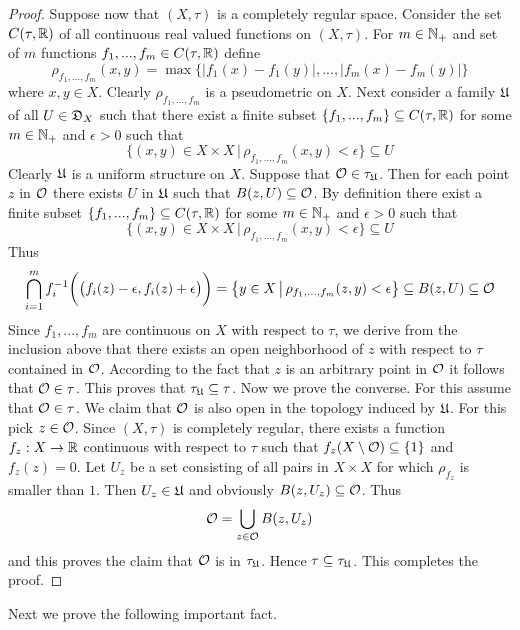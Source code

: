 \begin{proof}
Suppose now that $(X,\tau)$ is a completely regular space. Consider the set $C(\tau,{\mathbb R})$ of all continuous real valued functions on $(X,\tau)$. For $m\in {\mathbb N}_+$ and set of $m$ functions $f_1,...,f_m\in C(\tau,{\mathbb R})$ define
$$\rho_{f_1,...,f_m}(x,y) = \max \big\{|f_1(x) - f_1(y)|,...,|f_m(x) - f_m(y)|\big\}$$
where $x,y\in X$. Clearly $\rho_{f_1,...,f_m}$ is a pseudometric on $X$. Next consider a family ${\mathfrak U}$ of all $U\in {\mathfrak D}_X$ such that there exist a finite subset $\{f_1,...,f_m\}\subseteq C(\tau,{\mathbb R})$ for some $m \in {\mathbb N}_+$ and $\epsilon > 0$ such that
$$\big\{(x,y)\in X\times X\,\big|\,\rho_{f_1,...,f_m}(x,y) < \epsilon\big\}\subseteq U$$
Clearly ${\mathfrak U}$ is a uniform structure on $X$. Suppose that ${\mathcal O} \in \tau_{{\mathfrak U}}$. Then for each point $z$ in ${\mathcal O}$ there exists $U$ in ${\mathfrak U}$ such that $B(z,U)\subseteq {\mathcal O}$. By definition there exist a finite subset $\{f_1,...,f_m\}\subseteq C(\tau,{\mathbb R})$ for some $m \in {\mathbb N}_+$ and $\epsilon > 0$ such that
$$\big\{(x,y)\in X\times X\,\big|\,\rho_{f_1,...,f_m}(x,y) < \epsilon\big\}\subseteq U$$
Thus
$$\bigcap_{i=1}^mf_i^{-1}\bigg(\big(f_i(z) - \epsilon, f_i(z) + \epsilon\big)\bigg) = \big\{y\in X \,\big|\, \rho_{f_1,...,f_m}(z,y) < \epsilon\big\} \subseteq B(z,U)\subseteq {\mathcal O}$$
Since $f_1,...,f_m$ are continuous on $X$ with respect to $\tau$, we derive from the inclusion above that there exists an open neighborhood of $z$ with respect to $\tau$ contained in ${\mathcal O}$. According to the fact that $z$ is an arbitrary point in ${\mathcal O}$ it follows that ${\mathcal O} \in \tau$. This proves that $\tau_{{\mathfrak U}}\subseteq \tau$. Now we prove the converse. For this assume that ${\mathcal O} \in \tau$. We claim that ${\mathcal O}$ is also open in the topology induced by ${\mathfrak U}$. For this pick $z \in {\mathcal O}$. Since $(X,\tau)$ is completely regular, there exists a function $f_z:X\rightarrow {\mathbb R}$ continuous with respect to $\tau$ such that $f_z(X\setminus {\mathcal O})\subseteq \{1\}$ and $f_z(z) = 0$. Let $U_z$ be a set consisting of all pairs in $X\times X$ for which $\rho_{f_z}$ is smaller than $1$. Then $U_z\in {\mathfrak U}$ and obviously $B(z,U_z)\subseteq {\mathcal O}$. Thus
$${\mathcal O} = \bigcup_{z\in {\mathcal O}}B(z,U_z)$$
and this proves the claim that ${\mathcal O}$ is in $\tau_{{\mathfrak U}}$. Hence $\tau \subseteq \tau_{{\mathfrak U}}$. This completes the proof.
\end{proof}
\noindent
Next we prove the following important fact.

